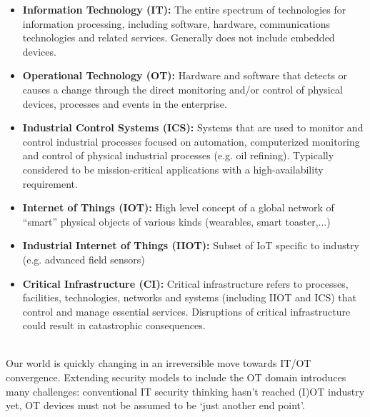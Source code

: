 \begin{itemize}
	\item \textbf{Information Technology (IT):} The entire spectrum of technologies for information processing, including software, hardware, communications technologies and related services. Generally does not include embedded devices.
	\item \textbf{Operational Technology (OT):} Hardware and software that detects or causes a change through the direct monitoring and/or control of physical devices, processes and events in the enterprise.
	\item \textbf{Industrial Control Systems (ICS):} Systems that are used to monitor and control industrial processes focused on automation, computerized monitoring and control of physical industrial processes (e.g. oil refining). Typically considered to be mission-critical applications with a high-availability requirement.
	\item \textbf{Internet of Things (IOT):} High level concept of a global network of “smart” physical objects of various kinds (wearables, smart toaster,...)\
	\item \textbf{Industrial Internet of Things (IIOT):} Subset of IoT specific to industry (e.g. advanced field sensors)
	\item \textbf{Critical Infrastructure (CI):} Critical infrastructure refers to processes, facilities, technologies, networks and systems (including IIOT and ICS) that control and manage essential services. Disruptions of critical infrastructure could result in catastrophic consequences.
\end{itemize}
\\
Our world is quickly changing in an irreversible move towards IT/OT convergence. Extending security models to include the OT domain introduces many challenges: conventional IT security thinking hasn't reached (I)OT industry yet, OT devices must not be assumed to be ‘just another end point’.

